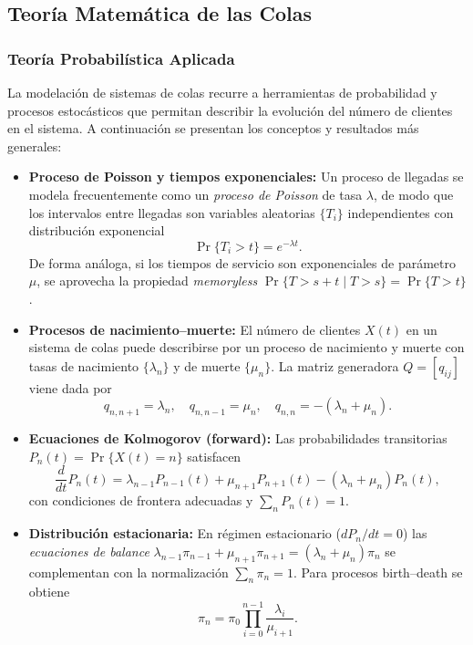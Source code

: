 \documentclass{article}
\begin{document}
\subsection{Teoría Matemática de las Colas}
\subsubsection{Teoría Probabilística Aplicada}
La modelación de sistemas de colas recurre a herramientas de probabilidad y procesos estocásticos que permitan describir la evolución del número de clientes en el sistema. A continuación se presentan los conceptos y resultados más generales:

\begin{itemize}
    \item \textbf{Proceso de Poisson y tiempos exponenciales:}  
    Un proceso de llegadas se modela frecuentemente como un \textit{proceso de Poisson} de tasa \(\lambda\), de modo que los intervalos entre llegadas son variables aleatorias \(\{T_i\}\) independientes con distribución exponencial
    \[
      \Pr\{T_i > t\} = e^{-\lambda t}.
    \]
    De forma análoga, si los tiempos de servicio son exponenciales de parámetro \(\mu\), se aprovecha la propiedad \textit{memoryless}
    \(\Pr\{T>s+t\mid T>s\}=\Pr\{T>t\}\).
    
    \item \textbf{Procesos de nacimiento–muerte:}  
    El número de clientes \(X(t)\) en un sistema de colas puede describirse por un proceso de nacimiento y muerte con tasas de nacimiento \(\{\lambda_n\}\) y de muerte \(\{\mu_n\}\). La matriz generadora \(Q=[q_{ij}]\) viene dada por
    \[
      q_{n,n+1}=\lambda_n,\quad
      q_{n,n-1}=\mu_n,\quad
      q_{n,n}=-(\lambda_n+\mu_n).
    \]
    
    \item \textbf{Ecuaciones de Kolmogorov (forward):}  
    Las probabilidades transitorias \(P_n(t)=\Pr\{X(t)=n\}\) satisfacen
    \[
      \frac{d}{dt}P_n(t)
        = \lambda_{n-1}P_{n-1}(t)
        + \mu_{n+1}P_{n+1}(t)
        - (\lambda_n+\mu_n)P_n(t),
    \]
    con condiciones de frontera adecuadas y \(\sum_nP_n(t)=1\).
    
    \item \textbf{Distribución estacionaria:}  
    En régimen estacionario (\(dP_n/dt=0\)) las \textit{ecuaciones de balance}  
    \(\lambda_{n-1}\pi_{n-1} + \mu_{n+1}\pi_{n+1} = (\lambda_n+\mu_n)\pi_n\)  
    se complementan con la normalización \(\sum_n\pi_n=1\). Para procesos birth–death se obtiene
    \[
      \pi_n = \pi_0 \prod_{i=0}^{n-1}\frac{\lambda_i}{\mu_{i+1}}.
    \]
    

\end{itemize}
\end{document}
